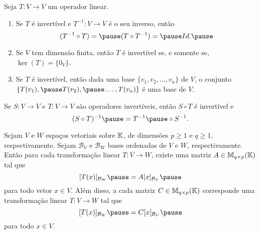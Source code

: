 \documentclass{beamer}
\begin{document}
    \begin{frame}
        \begin{proposicao}
            Seja $T \colon V \to V$ um operador linear.\pause
            \begin{enumerate}[label={\roman*})]
                \vspace*{.25cm}
                \item Se $T$ é invertível \pause e $T^{-1} \colon V \to V$ é o seu inverso, \pause então
                    \[
                        (T^{-1} \circ T) = \pause (T \circ T^{-1}) = \pause Id.\pause
                    \]

                \vspace{.75cm}

                \item Se $V$ tem dimensão finita, \pause então $T$ é invertível \pause se, e somente se, \pause $\ker(T) = \{0_V\}$.\pause

                \vspace{.75cm}

                \item Se $T$ é invertível, \pause então dada uma base $\{v_1, v_2, \dots, v_n\}$ de $V$, \pause o conjunto $\{T(v_1), \pause
                    T(v_2), \pause \dots, T(v_n)\}$ \pause é uma base de $V$.
            \end{enumerate}
        \end{proposicao}
    \end{frame}

    \begin{frame}
        \begin{proposicao}
            Se $S \colon V \to V$ e $T \colon V \to V$ \pause são operadores invertíveis, \pause então $S \circ T$ é invertível e\pause
            \[
                (S \circ T)^{-1} \pause = T^{-1} \pause \circ S^{-1}.
            \]
        \end{proposicao}
    \end{frame}

    \begin{frame}
        \begin{teorema}
            Sejam $V$ e $W$ espaços vetoriais sobre $\mathbb{K}$, \pause de dimensões $p \ge 1$ e $q \ge 1$, respectivamente. \pause Sejam
            $\mathcal{B}_V$ e $\mathcal{B}_W$ bases ordenadas de $V$ e $W$, respectivamente. \pause Então para cada transformação linear
            $T \colon V \to W$, \pause existe uma matriz $A \in \mathbb{M}_{q\times p}(\mathbb{K})$ tal que\pause
            \[
                [T(x)]_{\mathcal{B}_W} \pause = A[x]_{\mathcal{B}_V}\pause
            \]
            para todo vetor $x \in V$. \pause Além disso, \pause a cada matriz $C \in \mathbb{M}_{q\times p}(\mathbb{K})$ \pause corresponde uma
            transformação linear $T \colon V \to W$ tal que\pause
            \[
                [T(x)]_{\mathcal{B}_W} \pause = C[x]_{\mathcal{B}_V}\pause
            \]
            para todo $x \in V$.
        \end{teorema}
    \end{frame}
\end{document}
